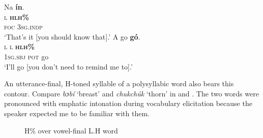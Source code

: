 \ea\label{ex:key:84}
\glll Na  \textbf{ín}.\\
\textsc{l}  \textbf{\textsc{h}}\textbf{\textsc{lh\%}}\\
\textsc{foc}  \textsc{3sg.indp}\\
\glt   ‘That’s it [you should know that].’
\z
\ea\label{ex:key:85}
\glll    A    go  \textbf{gó}.  \\
\textsc{l}    \textsc{l}  \textbf{\textsc{h}}\textbf{\textsc{lh\%}}\\
\textsc{1sg.sbj}  \textsc{pot}  go\\
\glt   ‘I’ll go [you don’t need to remind me to].’ 
\z

\largerpage
An utterance-final, H-toned syllable of a polysyllabic word also bears this contour. Compare \textit{bɔbí} ‘breast’ and \textit{chukchúk} ‘thorn’ in  and . The two words were pronounced with emphatic intonation during vocabulary elicitation because the speaker expected me to be familiar with them.

\begin{figure}
\caption{H\% over vowel-final L.H word}
\label{fig:key:3.33}
\end{figure}


